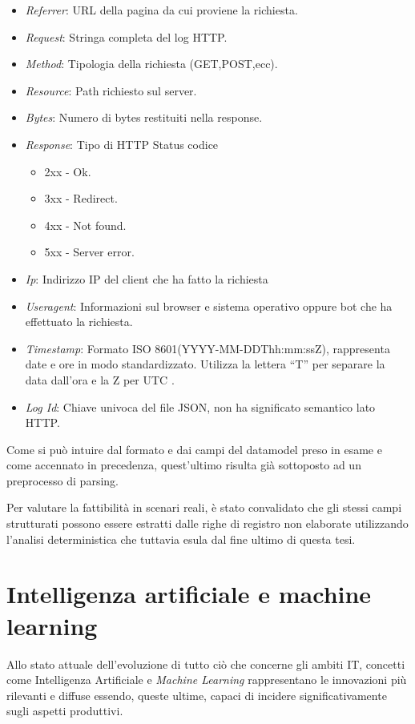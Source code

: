 \begin{itemize}
    \item \emph{Referrer}: URL della pagina da cui proviene la richiesta.
    \item \emph{Request}: Stringa completa del log HTTP.
    \item \emph{Method}: Tipologia della richiesta (GET,POST,ecc).
    \item \emph{Resource}: Path richiesto sul server.
    \item \emph{Bytes}: Numero di bytes restituiti nella response.
    \item \emph{Response}: Tipo di HTTP Status codice \begin{itemize}
              \item 2xx - Ok.
              \item 3xx - Redirect.
              \item 4xx - Not found.
              \item 5xx - Server error.
          \end{itemize}
    \item \emph{Ip}: Indirizzo IP del client che ha fatto la richiesta
    \item \emph{Useragent}: Informazioni sul browser e sistema operativo oppure bot che ha effettuato la richiesta.
    \item \emph{Timestamp}: Formato ISO 8601(YYYY-MM-DDThh:mm:ssZ), rappresenta date e ore in modo standardizzato. Utilizza la lettera “T” per separare la data dall’ora e la Z per UTC \parencite{iso8601}.
    \item \emph{Log Id}: Chiave univoca del file JSON, non ha significato semantico lato HTTP.

\end{itemize}

Come si può intuire dal formato e dai campi del datamodel preso in esame e come accennato in precedenza, quest’ultimo risulta già sottoposto ad un preprocesso di parsing.

Per valutare la fattibilità in scenari reali, è stato convalidato che gli stessi campi strutturati possono essere estratti dalle righe di registro non elaborate utilizzando l'analisi deterministica che tuttavia esula dal fine ultimo di questa tesi.

\section{Intelligenza artificiale e machine learning}
Allo stato attuale dell’evoluzione di tutto ciò che concerne gli ambiti IT, concetti come Intelligenza Artificiale e \emph{Machine Learning} rappresentano le innovazioni più rilevanti e diffuse essendo, queste ultime, capaci di incidere significativamente sugli aspetti produttivi.

